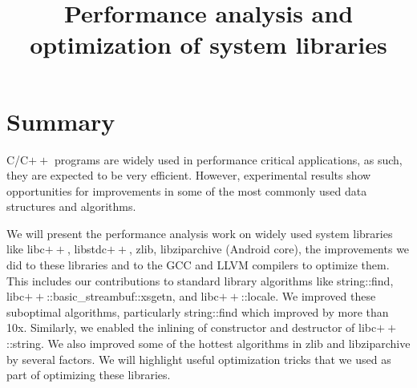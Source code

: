 \documentclass[10pt]{article}
\begin{document}
\title{Performance analysis and optimization of system libraries}


\date{}
\maketitle

\section*{Summary}
C/C$++$ programs are widely used in performance critical applications, as such,
they are expected to be very efficient. However, experimental results show
opportunities for improvements in some of the most commonly used data structures
and algorithms.

We will present the performance analysis work on widely used system libraries
like libc$++$, libstdc$++$, zlib, libziparchive (Android core), the improvements
we did to these libraries and to the GCC and LLVM compilers to optimize
them. This includes our contributions to standard library algorithms like
string::find, libc$++$::basic\_streambuf::xsgetn, and libc$++$::locale. We
improved these suboptimal algorithms, particularly string::find which improved
by more than 10x. Similarly, we enabled the inlining of constructor and
destructor of libc$++$::string. We also improved some of the hottest algorithms
in zlib and libziparchive by several factors. We will highlight useful
optimization tricks that we used as part of optimizing these libraries.
\end{document}
